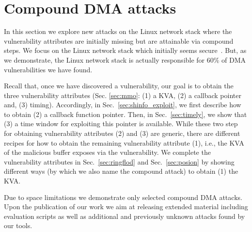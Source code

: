 \section{Compound DMA attacks}\label{sec:linux_net}



In this section we explore new attacks on the Linux network stack where the vulnerability attributes are initially missing but are attainable via compound steps.
We focus on the Linux network stack which initially seems secure~\cite{thunder}.
But, as we demonstrate, the Linux network stack is actually responsible for 60\% of DMA vulnerabilities we have found.

Recall that, once we have discovered a \subpage{} vulnerability, our goal is to obtain the three vulnerability attributes (Sec. \ref{sec:mmo}: (1) a KVA, (2) a callback pointer and, (3) timing). 
Accordingly, in Sec.~\ref{sec:shinfo_exploit}, we first describe how to obtain (2) a callback function pointer. Then, in Sec.~\ref{sec:timely}, we show that (3) a time window for exploiting this pointer is available. 
While these two step for obtaining vulnerability attributes (2) and (3) are generic, there are different recipes for how to obtain the remaining vulnerability attribute (1), i.e., the KVA of the malicious buffer exposes via the \subpage{} vulnerability. 
We complete the vulnerability attributes in Sec.~\ref{sec:ringflod} and Sec.~\ref{sec:posion} by showing different ways (by which we also name the compound attack) to obtain (1) the KVA.



Due to space limitations we demonstrate only selected compound DMA attacks. 
Upon the publication of our work we aim at releasing extended material including evaluation scripts as well as additional \compound and previously unknown \simple attacks found by our tools.

